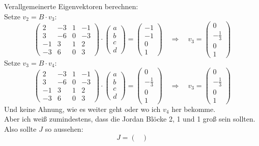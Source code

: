 

Verallgemeinerte Eigenvektoren berechnen: \\
Setze $v_2 = B \cdot v_3$: 
\[
\begin{pmatrix}
2 & -3 & 1 & -1 \\
3 & -6 & 0 & -3 \\
-1 & 3 & 1 & 2 \\
-3 & 6 & 0 & 3
\end{pmatrix} \cdot \begin{pmatrix}
a\\b\\c\\d
\end{pmatrix} = \begin{pmatrix}
-1 \\ -1 \\ 0 \\ 1
\end{pmatrix} \quad \Rightarrow \quad v_3 = \begin{pmatrix}
0 \\ -\frac{1}{3} \\ 0 \\ 1
\end{pmatrix}
\]
Setze $v_3 = B \cdot v_4$: 
\[
\begin{pmatrix}
2 & -3 & 1 & -1 \\
3 & -6 & 0 & -3 \\
-1 & 3 & 1 & 2 \\
-3 & 6 & 0 & 3
\end{pmatrix} \cdot \begin{pmatrix}
a\\b\\c\\d
\end{pmatrix} = \begin{pmatrix}
0 \\ -\frac{1}{3} \\ 0 \\ 1
\end{pmatrix} \quad \Rightarrow \quad v_3 = \begin{pmatrix}
0 \\ -\frac{1}{3} \\ 0 \\ 1
\end{pmatrix}
\]
Und keine Ahnung, wie es weiter geht oder wo ich $v_4$ her bekomme. \\
Aber ich weiß zumindestens, dass die Jordan Blöcke 2, 1 und 1 groß sein sollten. Also sollte $J$ so aussehen: 
\[
J = \begin{pmatrix}

\end{pmatrix}
\]

